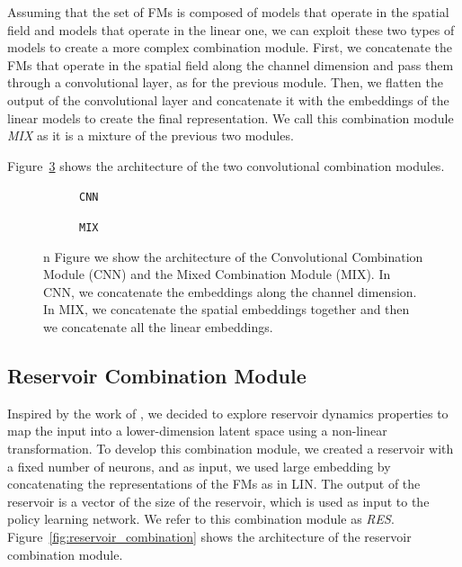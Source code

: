 Assuming that the set of FMs is composed of models that operate in the spatial field and models that operate in the linear one, we can exploit these two types of models to create a more complex combination module.
First, we concatenate the FMs that operate in the spatial field along the channel dimension and pass them through a convolutional layer, as for the previous module.
Then, we flatten the output of the convolutional layer and concatenate it with the embeddings of the linear models to create the final representation.
We call this combination module \textit{MIX} as it is a mixture of the previous two modules.

Figure~\ref{fig:conv_combination} shows the architecture of the two convolutional combination modules.

\begin{figure}[ht]
    \centering
    \begin{subfigure}[b]{0.47\textwidth}
        \centering
        \fbox{\rule[-.5cm]{0cm}{4cm} \rule[-.5cm]{4cm}{0cm}}
        \caption{\texttt{CNN}}
        \label{fig:cnn}
    \end{subfigure}
    \hfill
    \begin{subfigure}[b]{0.47\textwidth}
        \centering
        \fbox{\rule[-.5cm]{0cm}{4cm} \rule[-.5cm]{4cm}{0cm}}
        \caption{\texttt{MIX}}
        \label{fig:mix}
    \end{subfigure}

    \caption{n Figure we show the architecture of the Convolutional Combination Module (CNN) and the Mixed Combination Module (MIX). In CNN, we concatenate the embeddings along the channel dimension. In MIX, we concatenate the spatial embeddings together and then we concatenate all the linear embeddings.}
    \label{fig:conv_combination}
\end{figure}

\subsection{Reservoir Combination Module}
\label{subsec:reservoir_combination}
Inspired by the work of \citet{gallicchio2017}, we decided to explore reservoir dynamics properties to map the input into a lower-dimension latent space using a non-linear transformation.
To develop this combination module, we created a reservoir with a fixed number of neurons, and as input, we used large embedding by concatenating the representations of the FMs as in LIN\@.
The output of the reservoir is a vector of the size of the reservoir, which is used as input to the policy learning network.
We refer to this combination module as \textit{RES}.
Figure~\ref{fig:reservoir_combination} shows the architecture of the reservoir combination module.

